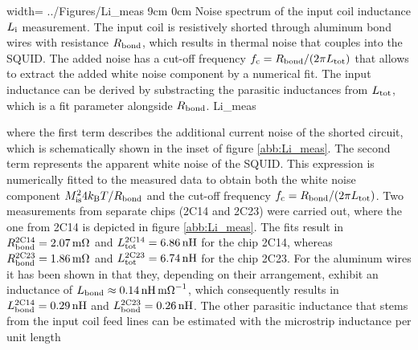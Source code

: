 {width=\textwidth} %
{../Figures/Li_meas}
{9cm} %
{0cm}
{Noise spectrum of the input coil inductance $L_{\rm i}$ measurement. The input coil is resistively shorted through aluminum bond wires with resistance $R_{\rm bond}$, which results in thermal noise that couples into the SQUID. The added noise has a cut-off frequency $f_{\rm c}=R_{\rm bond}/(2\pi L_{\rm tot})$ that allows to extract the added white noise component by a numerical fit. The input inductance can be derived by substracting the parasitic inductances from $L_{\rm tot}$, which is a fit parameter alongside $R_{\rm bond}$.}
{Li_meas}


where the first term describes the additional current noise of the shorted circuit, which is schematically shown in the inset of figure \ref{abb:Li_meas}. The second term represents the apparent white noise of the SQUID. This expression is numerically fitted to the measured data to obtain both the white noise component $ M_{\rm is}^24k_{\rm B}T/R_{\rm bond}$ and the cut-off frequency $f_{\rm c}=R_{\rm bond}/(2\pi L_{\rm tot})$. Two measurements from separate chips (2C14 and 2C23) were carried out, where the one from 2C14 is depicted in figure \ref{abb:Li_meas}. The fits result in $R_{\rm bond}^{\rm 2C14}=\qty{2.07}{\milli\ohm}$ and $L_{\rm tot}^{\rm 2C14}=\qty{6.86}{\nH}$ for the chip 2C14, whereas $R_{\rm bond}^{\rm 2C23}=\qty{1.86}{\milli\ohm}$ and $L_{\rm tot}^{\rm 2C23}=\qty{6.74}{\nH}$ for the chip 2C23. For the aluminum wires it has been shown in \cite{Hengstler2017} that they, depending on their arrangement, exhibit an inductance of $L_{\rm bond}\approx\qty{0.14}{\nano\henry\per\milli\ohm}$, which consequently results in $L_{\rm bond}^{\rm 2C14}=\qty{0.29}{\nH}$ and  $L_{\rm bond}^{\rm 2C23}=\qty{0.26}{\nH}$. The other parasitic inductance that stems from the input coil feed lines can be estimated with the microstrip inductance per unit length \cite{Chang1979}


